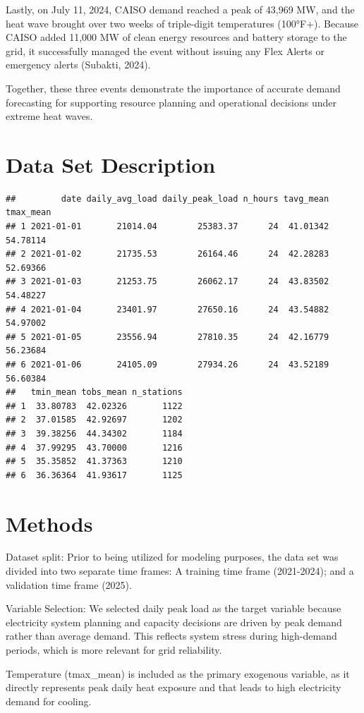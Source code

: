 \documentclass[
]{article}
\begin{document}
Lastly, on July 11, 2024, CAISO demand reached a peak of 43,969 MW, and
the heat wave brought over two weeks of triple-digit temperatures
(100°F+). Because CAISO added 11,000 MW of clean energy resources and
battery storage to the grid, it successfully managed the event without
issuing any Flex Alerts or emergency alerts (Subakti, 2024).

Together, these three events demonstrate the importance of accurate
demand forecasting for supporting resource planning and operational
decisions under extreme heat waves.

\section{Data Set Description}\label{data-set-description}

\begin{verbatim}
##         date daily_avg_load daily_peak_load n_hours tavg_mean tmax_mean
## 1 2021-01-01       21014.04        25383.37      24  41.01342  54.78114
## 2 2021-01-02       21735.53        26164.46      24  42.28283  52.69366
## 3 2021-01-03       21253.75        26062.17      24  43.83502  54.48227
## 4 2021-01-04       23401.97        27650.16      24  43.54882  54.97002
## 5 2021-01-05       23556.94        27810.35      24  42.16779  56.23684
## 6 2021-01-06       24105.09        27934.26      24  43.52189  56.60384
##   tmin_mean tobs_mean n_stations
## 1  33.80783  42.02326       1122
## 2  37.01585  42.92697       1202
## 3  39.38256  44.34302       1184
## 4  37.99295  43.70000       1216
## 5  35.35852  41.37363       1210
## 6  36.36364  41.93617       1125
\end{verbatim}

\section{Methods}\label{methods}

Dataset split: Prior to being utilized for modeling purposes, the data
set was divided into two separate time frames: A training time frame
(2021-2024); and a validation time frame (2025).

Variable Selection: We selected daily peak load as the target variable
because electricity system planning and capacity decisions are driven by
peak demand rather than average demand. This reflects system stress
during high-demand periods, which is more relevant for grid reliability.

Temperature (tmax\_mean) is included as the primary exogenous variable,
as it directly represents peak daily heat exposure and that leads to
high electricity demand for cooling.
\end{document}
